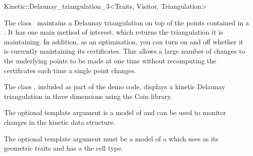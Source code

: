 

\begin{ccRefClass}{Kinetic::Delaunay_triangulation_3<Traits, Visitor, Triangulation>}  %


\ccDefinition
  
The class \ccRefName\ maintains a Delaunay triangulation on top of the
points contained in a . It has one main method
of interest.  which returns the triangulation it
is maintaining. In addition, as an optimisation, you can turn on and
off whether it is currently maintaining its certificates. This allows
a large number of changes to the underlying points to be made at one
time without recomputing the certificates each time a single point
changes.

The class , included as part
of the demo code, displays a kinetic Delaunay triangulation in three
dimensions using the Coin library.

The optional  template argument is a model of
 and can be used to monitor
changes in the kinetic data structure.

The optional  template argument must be a model of
a  which uses
 as its geometric traits and has
 a the cell
type.



\ccTypes



\ccCreation
{}  %


\end{ccRefClass}
